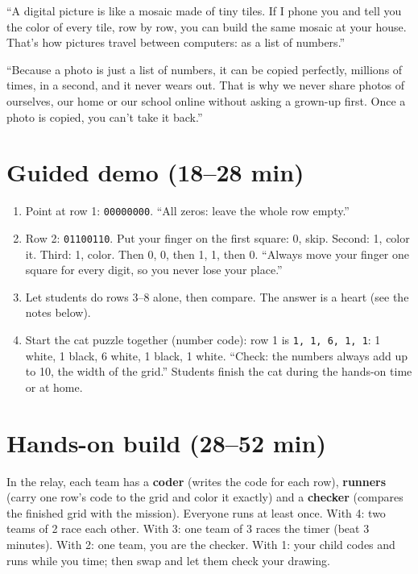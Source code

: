 \begin{analogy}[A mosaic]
\enquote{A digital picture is like a mosaic made of tiny tiles. If I phone you and tell you the color of every tile, row by row, you can build the same mosaic at your house. That's how pictures travel between computers: as a list of numbers.}
\end{analogy}

\begin{safety}
\enquote{Because a photo is just a list of numbers, it can be copied perfectly, millions of times, in a second, and it never wears out. That is why we never share photos of ourselves, our home or our school online without asking a grown-up first. Once a photo is copied, you can't take it back.}
\end{safety}

\section{Guided demo (18--28 min)}
\begin{workedexample}
\begin{enumerate}[leftmargin=1.4em,itemsep=1pt]
  \item Point at row 1: \texttt{00000000}. \enquote{All zeros: leave the whole row empty.}
  \item Row 2: \texttt{01100110}. Put your finger on the first square: 0, skip. Second: 1, color it. Third: 1, color. Then 0, 0, then 1, 1, then 0. \enquote{Always move your finger one square for every digit, so you never lose your place.}
  \item Let students do rows 3--8 alone, then compare. The answer is a heart (see the notes below).
  \item Start the cat puzzle together (number code): row 1 is \texttt{1, 1, 6, 1, 1}: 1 white, 1 black, 6 white, 1 black, 1 white. \enquote{Check: the numbers always add up to 10, the width of the grid.} Students finish the cat during the hands-on time or at home.
\end{enumerate}
\end{workedexample}

\section{Hands-on build (28--52 min)}
\begin{pairroles}
In the relay, each team has a \textbf{coder} (writes the code for each row), \textbf{runners} (carry one row's code to the grid and color it exactly) and a \textbf{checker} (compares the finished grid with the mission). Everyone runs at least once. With 4: two teams of 2 race each other. With 3: one team of 3 races the timer (beat 3 minutes). With 2: one team, you are the checker. With 1: your child codes and runs while you time; then swap and let them check your drawing.
\end{pairroles}

